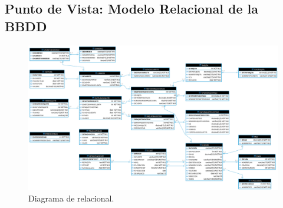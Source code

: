 \subsection{Punto de Vista: Modelo Relacional de la BBDD}
\begin{figure}[H]
    \centering
	\includegraphics[width=1\linewidth]{puntovista/dia-relacional.png}
	\caption{Diagrama de relacional.}
	\label{fig:dia-relacional}
\end{figure}
